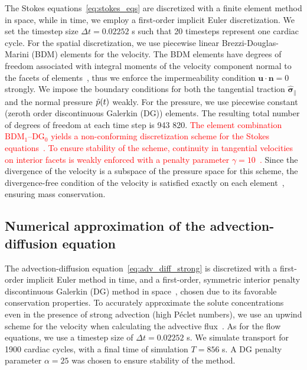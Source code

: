 \documentclass[fleqn]{wlscirep}
\newcommand{\nn}{\mathbf{n}}
\newcommand{\uu}{\mathbf{u}}
\newcommand{\bsig}{\bm{\sigma}}
\newcommand{\bsigpar}{\hat{\bsig}_{\parallel}}
\newcommand{\fixme}[1]{\textcolor{red}{#1}}
\begin{document}
The Stokes equations~\eqref{eq:stokes_eqs} are discretized with a finite element method
in space, while in time, we employ a first-order implicit Euler discretization.
We set the timestep size $\Delta t = 0.02252$ s such that 20 timesteps represent one cardiac cycle.
For the spatial discretization, we use piecewise linear Brezzi-Douglas-Marini (BDM) elements for the velocity.
The BDM elements have degrees of freedom associated with integral moments of the
velocity component normal to the facets of elements~\cite{Brezzi1985TwoProblems},
thus we enforce the impermeability condition $\uu\cdot\nn=0$ strongly.
We impose the boundary conditions for both the tangential traction $\bsigpar$ and
the normal pressure $\Tilde{p}(t)$ weakly.
For the pressure, we use piecewise constant (zeroth order discontinuous Galerkin (DG)) elements.
The resulting total number of degrees of freedom at each time step is 943 820.
\fixme{The element combination $\mathrm{BDM}_1$--$\mathrm{DG}_{0}$ yields a non-conforming
discretization scheme for the Stokes equations~\cite{Stenberg1989SomeEquations}.
To ensure stability of the scheme, continuity in tangential velocities on interior facets
is weakly enforced with a penalty parameter $\gamma=10$~\cite{Hong2016AEquations}.}
Since the divergence of the velocity is a subspace of the pressure space for this scheme,
the divergence-free condition of the velocity is satisfied exactly on each
element~\cite{Boffi2008FiniteProblem}, ensuring mass conservation. 

\subsection*{Numerical approximation of the advection-diffusion equation}
The advection-diffusion equation~\eqref{eq:adv_diff_strong} is discretized
with a first-order implicit Euler method in time, and a first-order,
symmetric interior penalty discontinuous Galerkin (DG)
method in space~\cite{Arnold1982AnElements}, chosen due to its favorable
conservation properties.
To accurately approximate the solute concentrations even
in the presence of strong advection (high Péclet numbers),
we use an upwind scheme for the velocity when calculating the
advective flux~\cite{Patankar2018NumericalFlow}.
As for the flow equations, we use a timestep size of
$\Delta t = 0.02252$ s. We simulate transport for 1900 cardiac cycles,
with a final time of simulation $T = 856$ s.
A DG penalty parameter $\alpha = 25$ was chosen to ensure stability of the method. 
\end{document}
